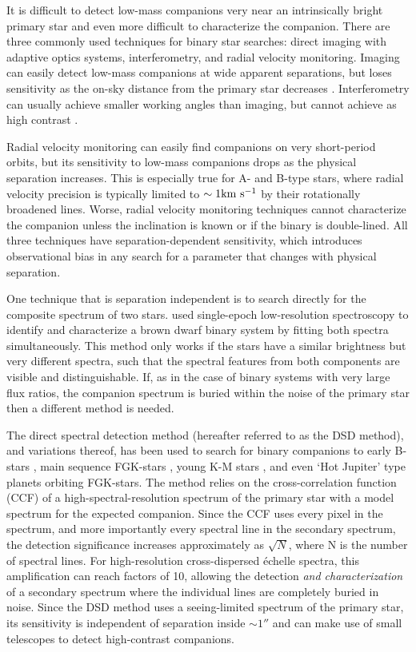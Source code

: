 \documentclass{emulateapj}
\begin{document}
It is difficult to detect low-mass companions very near an intrinsically bright primary star and even more difficult to characterize the companion. There are three commonly used techniques for binary star searches: direct imaging with adaptive optics systems,  interferometry, and radial velocity monitoring. Imaging can easily detect low-mass companions at wide apparent separations, but loses sensitivity as the on-sky distance from the primary star decreases \citep[see][for typical sensitivity curves]{DeRosa2014}. Interferometry can usually achieve smaller working angles than imaging, but cannot achieve as high contrast \citep[see e.g.][]{Aldoretta2015}.

 Radial velocity monitoring can easily find companions on very short-period orbits, but its sensitivity to low-mass companions drops as the physical separation increases. This is especially true for A- and B-type stars, where radial velocity precision is typically limited to $\sim 1 \rm km \  s^{-1}$ by their rotationally broadened lines. Worse, radial velocity monitoring techniques cannot characterize the companion unless the inclination is known or if the binary is double-lined. All three techniques have separation-dependent sensitivity, which introduces observational bias in any search for a parameter that changes with physical separation.
 
 One technique that is separation independent is to search directly for the composite spectrum of two stars. \citet{Burgasser2007} used single-epoch low-resolution spectroscopy to identify and characterize a brown dwarf binary system by fitting both spectra simultaneously. This method only works if the stars have a similar brightness but very different spectra, such that the spectral features from both components are visible and distinguishable. If, as in the case of binary systems with very large flux ratios, the companion spectrum is buried within the noise of the primary star then a different method is needed.
 
The direct spectral detection method (hereafter referred to as the DSD method), and variations thereof, has been used to search for binary companions to early B-stars \citep{Gullikson2013}, main sequence FGK-stars \citep{Kolbl2015}, young K-M stars \citep{Prato2002}, and even `Hot Jupiter' type planets \citep{Snellen2010, Brogi2012, deKok2013} orbiting FGK-stars. The method relies on the cross-correlation function (CCF) of a high-spectral-resolution spectrum of the primary star with a model spectrum for the expected companion. Since the CCF uses every pixel in the spectrum, and more importantly every spectral line in the secondary spectrum, the detection significance increases approximately as $\sqrt{N}$, where N is the number of spectral lines. For high-resolution cross-dispersed \'echelle spectra, this amplification can reach factors of 10, allowing the detection \emph{and characterization} of a secondary spectrum where the individual lines are completely buried in noise. Since the DSD method uses a seeing-limited spectrum of the primary star, its sensitivity is independent of separation inside $\sim 1 ''$ and can make use of small telescopes to detect high-contrast companions.
\end{document}
